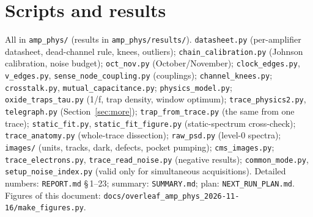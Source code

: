 \documentclass[11pt]{article}
\begin{document}
\appendix
\section{Scripts and results}
All in \texttt{amp\_phys/} (results in \texttt{amp\_phys/results/}). \texttt{datasheet.py} (per-amplifier datasheet,
dead-channel rule, knees, outliers); \texttt{chain\_calibration.py} (Johnson calibration, noise budget);
\texttt{oct\_nov.py} (October/November); \texttt{clock\_edges.py}, \texttt{v\_edges.py}, \texttt{sense\_node\_coupling.py}
(couplings); \texttt{channel\_knees.py}; \texttt{crosstalk.py}, \texttt{mutual\_capacitance.py};
\texttt{physics\_model.py}; \texttt{oxide\_traps\_tau.py} (1/f, trap density, window optimum); \texttt{trace\_physics2.py}, \texttt{telegraph.py} (Section~\ref{sec:more}); \texttt{trap\_from\_trace.py} (the same from one
trace); \texttt{static\_fit.py}, \texttt{static\_fit\_figure.py} (static-spectrum cross-check); \texttt{trace\_anatomy.py} (whole-trace
dissection); \texttt{raw\_psd.py} (level-0 spectra); \texttt{images/} (units, tracks, dark, defects, pocket pumping); \texttt{cms\_images.py};
\texttt{trace\_electrons.py}, \texttt{trace\_read\_noise.py} (negative results); \texttt{common\_mode.py},
\texttt{setup\_noise\_index.py} (valid only for simultaneous acquisitions). Detailed numbers: \texttt{REPORT.md}
\S\,1--23; summary: \texttt{SUMMARY.md}; plan: \texttt{NEXT\_RUN\_PLAN.md}. Figures of this document:
\texttt{docs/overleaf\_amp\_phys\_2026-11-16/make\_figures.py}.
\end{document}
